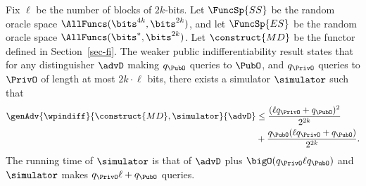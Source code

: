 Fix $\ell$ be the number of blocks of $2k$-bits. Let $\FuncSp{SS}$ be the random oracle space $\AllFuncs(\bits^{4k}, \bits^{2k})$, and let $\FuncSp{ES}$ be the random oracle space $\AllFuncs(\bits^{*}, \bits^{2k})$. Let $\construct{MD}$ be the functor defined in Section~\ref{sec-fi}.
The weaker public indifferentiability result states that for any distinguisher $\advD$ making $q_{\PubO}$ queries to $\PubO$, and $q_{\PrivO}$ queries to $\PrivO$ of length at most $2k \cdot \ell$ bits, there exists a simulator $\simulator$ such that
\begin{align*}
	\genAdv{\wpindiff}{\construct{MD},\simulator}{\advD} &\leq \frac{(\ell q_{\PrivO} + q_{\PubO})^2}{2^{2k}}\\
	&+ \frac{q_{\PubO}(\ell q_{\PrivO} + q_{\PubO})}{2^{2k}}.
\end{align*} The running time of $\simulator$ is that of $\advD$ plus $\bigO(q_{\PrivO}\ell q_{\PubO})$ and $\simulator$ makes $q_{\PrivO}\ell+q_{\PubO}$ queries.

